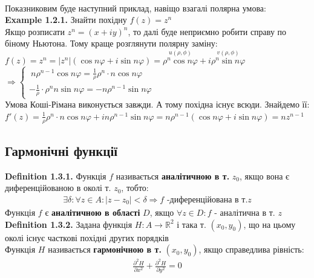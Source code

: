 \documentclass[a4paper, 14pt]{extarticle}
\def\hugespace{\vspace{5mm} \\}
\begin{document}
	\\
	Показниковим буде наступний приклад, навіщо взагалі полярна умова:
	\hugespace
	\textbf{Example 1.2.1.} Знайти похідну $f(z)=z^n$\\
	Якщо розписати $z^n = (x+iy)^n$, то далі буде неприємно робити справу по біному Ньютона. Тому краще розглянути полярну заміну:\\
	$f(z) = z^n = |z^n|(\cos n \varphi + i\sin n \varphi) = \overset{u(\rho, \phi)}{\rho^n \cos n\varphi}  + i \overset{v(\rho, \phi)}{\rho^n \sin n\varphi}$\\
			$\Rightarrow \begin{cases}
		\displaystyle\ n \rho^{n-1} \cos n\varphi = \frac{1}{\rho} \rho^n \cdot n \cos n \varphi \\
		\displaystyle -\frac{1}{\rho} \cdot \rho^n n \sin n \varphi =- n \rho^{n-1} \sin n \varphi
	\end{cases}$
	\\
	Умова Коші-Рімана виконується завжди. А тому похідна існує всюди. Знайдемо її:\\
	$f'(z)= \displaystyle \frac{1}{\rho} \rho^n \cdot n \cos n \varphi + i n \rho^{n-1} \sin n \varphi = n\rho^{n-1}\left(\cos n\varphi + i \sin n\varphi  \right) = nz^{n-1}$
	\hugespace
	
	\subsection{Гармонічні функції}
	\textbf{Definition 1.3.1.} Функція $f$ називається \textbf{аналітичною в т.} $z_0$, якщо вона є диференційованою в околі т. $z_0$, тобто:
	\begin{align*}
	\exists \delta: \forall z \in A: |z-z_0|<\delta \Rightarrow f \text{ -диференційована в т.} z
	\end{align*}
	Функція $f$ є \textbf{аналітичною в області} $D$, якщо $\forall z \in D: f$ - аналітична в т. $z$\\
	
	\textbf{Definition 1.3.2.} Задана функція $H: A \rightarrow \mathbb{R}^2$ і така т. $(x_0,y_0)$, що на цьому околі існує часткові похідні других порядків \\
	Функція $H$ називається \textbf{гармонічною в т.} $(x_0,y_0)$, якщо справедлива рівність:
	\begin{align*}
	\frac{\partial^2 H}{\partial x^2} + \frac{\partial^2 H}{\partial y^2} = 0
	\end{align*}
	\\
	
\end{document}
